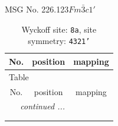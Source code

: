\documentclass[fleqn,8pt]{jsarticle}
\begin{document}
\setcounter{MaxMatrixCols}{32}

\renewcommand{\tablename}{Table~}
\renewcommand{\figurename}{Figure~}
\begin{center}
\LARGE
MSG No. 226.123\quad$Fm\bar{3}c1'$
\end{center}
\renewcommand{\arraystretch}{1.2}
\begin{longtable}{ccc}
\caption{Wyckoff site: {\tt 8a}, site symmetry: {\tt 4321'}}
 \\
 \hline \hline
No. & position & mapping \\ \hline \endfirsthead

\multicolumn{2}{l}{\tablename\ \thetable{}} \\
 \hline \hline
No. & position & mapping \\ \hline \endhead

 \hline \hline
\multicolumn{2}{r}{\footnotesize\it continued ...} \\ \endfoot

 \hline \hline
\multicolumn{2}{r}{} \\ \endlastfoot


\end{longtable}
\end{document}
